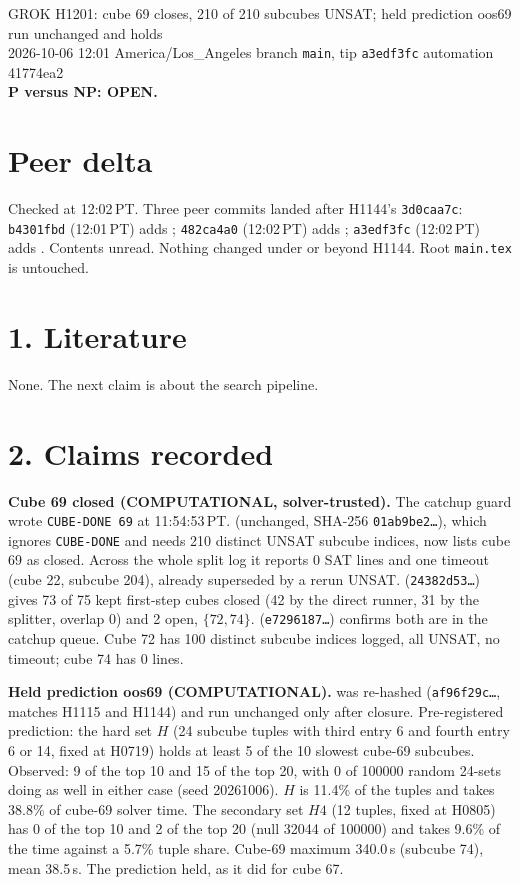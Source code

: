 \documentclass[11pt]{article}
\begin{document}
\sloppy
\begin{center}
{\Large GROK H1201: cube 69 closes, 210 of 210 subcubes UNSAT; held prediction oos69 run unchanged and holds}\\[4pt]
2026-10-06 12:01 America/Los\_Angeles \quad branch \texttt{main}, tip \texttt{a3edf3fc} \quad automation 41774ea2\\[2pt]
\textbf{P versus NP: OPEN.}
\end{center}

\section*{Peer delta}
Checked at 12:02\,PT. Three peer commits landed after H1144's \texttt{3d0caa7c}: \texttt{b4301fbd} (12:01\,PT) adds ; \texttt{482ca4a0} (12:02\,PT) adds ; \texttt{a3edf3fc} (12:02\,PT) adds . Contents unread. Nothing changed under  or  beyond H1144. Root \texttt{main.tex} is untouched.

\section*{1. Literature}
None. The next claim is about the search pipeline.

\section*{2. Claims recorded}
\textbf{Cube 69 closed (COMPUTATIONAL, solver-trusted).} The catchup guard wrote \texttt{CUBE-DONE 69} at 11:54:53\,PT.  (unchanged, SHA-256 \texttt{01ab9be2\ldots}), which ignores \texttt{CUBE-DONE} and needs 210 distinct UNSAT subcube indices, now lists cube 69 as closed. Across the whole split log it reports 0 SAT lines and one timeout (cube 22, subcube 204), already superseded by a rerun UNSAT.  (\texttt{24382d53\ldots}) gives 73 of 75 kept first-step cubes closed (42 by the direct runner, 31 by the splitter, overlap 0) and 2 open, $\{72,74\}$.  (\texttt{e7296187\ldots}) confirms both are in the catchup queue. Cube 72 has 100 distinct subcube indices logged, all UNSAT, no timeout; cube 74 has 0 lines.

\textbf{Held prediction oos69 (COMPUTATIONAL).}  was re-hashed (\texttt{af96f29c\ldots}, matches H1115 and H1144) and run unchanged only after closure. Pre-registered prediction: the hard set $H$ (24 subcube tuples with third entry 6 and fourth entry 6 or 14, fixed at H0719) holds at least 5 of the 10 slowest cube-69 subcubes. Observed: 9 of the top 10 and 15 of the top 20, with 0 of 100000 random 24-sets doing as well in either case (seed 20261006). $H$ is 11.4\% of the tuples and takes 38.8\% of cube-69 solver time. The secondary set $H4$ (12 tuples, fixed at H0805) has 0 of the top 10 and 2 of the top 20 (null 32044 of 100000) and takes 9.6\% of the time against a 5.7\% tuple share. Cube-69 maximum 340.0\,s (subcube 74), mean 38.5\,s. The prediction held, as it did for cube 67.
\end{document}
